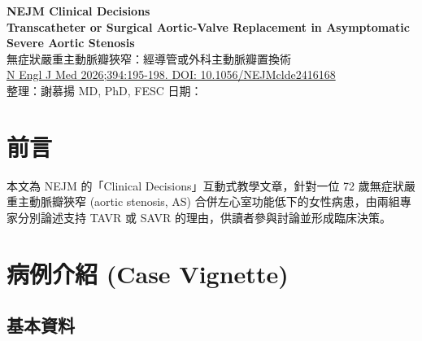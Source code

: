 \documentclass[12pt,a4paper]{article}
\begin{document}
\begin{center}
{\LARGE\bfseries\textcolor{emergency_red}{NEJM Clinical Decisions}}\\[0.5cm]
{\Large\textbf{Transcatheter or Surgical Aortic-Valve Replacement in Asymptomatic Severe Aortic Stenosis}}\\[0.3cm]
{\large 無症狀嚴重主動脈瓣狹窄：經導管或外科主動脈瓣置換術}\\[0.5cm]
{\normalsize \href{https://doi.org/10.1056/NEJMclde2416168}{N Engl J Med 2026;394:195-198. DOI: 10.1056/NEJMclde2416168}}\\[0.3cm]
{\normalsize 整理：謝慕揚 MD, PhD, FESC \quad 日期：\mydate}
\end{center}

\tableofcontents
\newpage

\section{前言}

本文為 NEJM 的「Clinical Decisions」互動式教學文章，針對一位 72 歲無症狀嚴重主動脈瓣狹窄 (aortic stenosis, AS) 合併左心室功能低下的女性病患，由兩組專家分別論述支持 TAVR 或 SAVR 的理由，供讀者參與討論並形成臨床決策。


\section{病例介紹 (Case Vignette)}

\subsection{基本資料}
\end{document}
